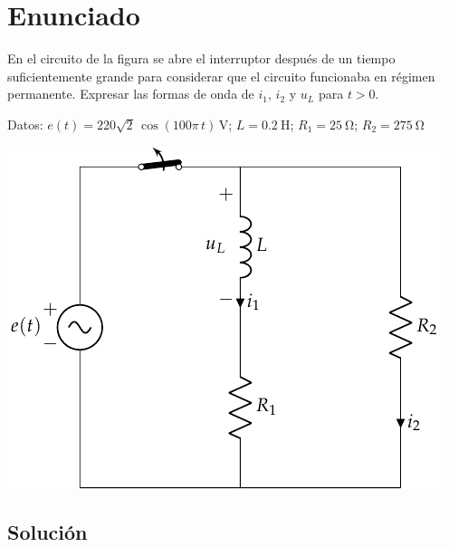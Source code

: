\section{Enunciado}
En el circuito de la figura se abre el interruptor después de un
  tiempo suficientemente grande para considerar que el circuito
  funcionaba en régimen permanente. Expresar las formas de onda de
  $i_1$, $i_2$ y $u_L$ para $t>0$.

  Datos:\; $e(t)=220\sqrt{2}\,\cos(100\pi\,t)\,\unit{\volt}$;\;
  $L = \qty{0.2}{\henry}$;\; $R_1 = \qty{25}{\ohm}$;\;
  $R_2 = \qty{275}{\ohm}$
  
\begin{center}
  \includegraphics{figuras/BT4_05.pdf}
\end{center}

\subsection*{Solución}


